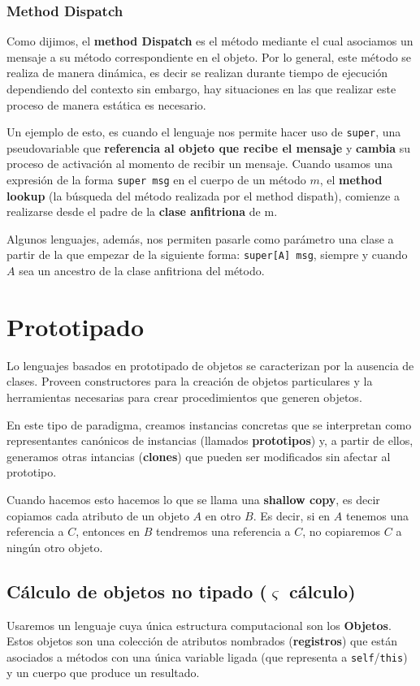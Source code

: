 \subsubsection{Method Dispatch}

Como dijimos, el \textbf{method Dispatch} es el método mediante el cual asociamos un mensaje a su método correspondiente en el objeto. Por lo general, este método se realiza de manera dinámica, es decir se realizan durante tiempo de ejecución dependiendo del contexto sin embargo, hay situaciones en las que realizar este proceso de manera estática es necesario. 

Un ejemplo de esto, es cuando el lenguaje nos permite hacer uso de \texttt{super}, una pseudovariable que \textbf{referencia al objeto que recibe el mensaje} y \textbf{cambia} su proceso de activación al momento de recibir un mensaje.
Cuando usamos una expresión de la forma \texttt{super msg} en el cuerpo de un método $m$, el \textbf{method lookup} (la búsqueda del método realizada por el method dispath), comienze a realizarse desde el padre de la \textbf{clase anfitriona} de m.

Algunos lenguajes, además, nos permiten pasarle como parámetro una clase a partir de la que empezar de la siguiente forma: \texttt{super[A] msg}, siempre y cuando $A$ sea un ancestro de la clase anfitriona del método.

\newpage
\section{Prototipado}
Lo lenguajes basados en prototipado de objetos se caracterizan por la ausencia de clases. Proveen constructores para la creación de objetos particulares y la herramientas necesarias para crear procedimientos que generen objetos.

En este tipo de paradigma, creamos instancias concretas que se interpretan como representantes canónicos de instancias (llamados \textbf{prototipos}) y, a partir de ellos, generamos otras intancias (\textbf{clones}) que pueden ser modificados sin afectar al prototipo.

Cuando hacemos esto hacemos lo que se llama una \textbf{shallow copy}, es decir copiamos cada atributo de un objeto $A$ en otro $B$. Es decir, si en $A$ tenemos una referencia a $C$, entonces en $B$ tendremos una referencia a $C$, no copiaremos $C$ a ningún otro objeto.

\subsection{Cálculo de objetos no tipado \texorpdfstring{($\varsigma$ cálculo)}{}}
Usaremos un lenguaje cuya única estructura computacional son los \textbf{Objetos}. Estos objetos son una colección de atributos nombrados (\textbf{registros}) que están asociados a métodos con una única variable ligada (que representa a \texttt{self}/\texttt{this}) y un cuerpo que produce un resultado.

